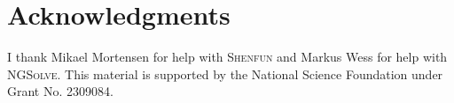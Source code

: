 \documentclass[onefignum,onetabnum]{siamart190516}
\begin{document}



\section*{Acknowledgments}
I thank Mikael Mortensen for help with \textsc{Shenfun} and Markus Wess for help with \textsc{NGSolve}. This material is supported by the National Science Foundation under Grant No. 2309084.

\pagebreak

%



\end{document}
